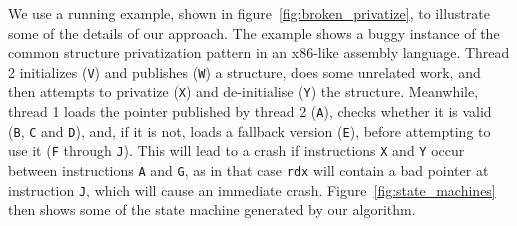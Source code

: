 \documentclass[10pt,twocolumn,preprint,natbib,authoryear]{sigplanconf}
\begin{document}
\begin{figure*}[t]
\caption{State machines produced for the example program}
\label{fig:state_machines}
\end{figure*}

We use a running example, shown in figure~\ref{fig:broken_privatize},
to illustrate some of the details of our approach.  The example shows
a buggy instance of the common structure privatization pattern in an
x86-like assembly language.  Thread 2 initializes (\verb|V|) and
publishes (\verb|W|) a structure, does some unrelated work, and then
attempts to privatize (\verb|X|) and de-initialise (\verb|Y|) the
structure.  Meanwhile, thread 1 loads the pointer published by thread
2 (\verb|A|), checks whether it is valid (\verb|B|, \verb|C| and
\verb|D|), and, if it is not, loads a fallback version (\verb|E|),
before attempting to use it (\verb|F| through \verb|J|).  This will
lead to a crash if instructions \verb|X| and \verb|Y| occur between
instructions \verb|A| and \verb|G|, as in that case \verb|rdx| will
contain a bad pointer at instruction \verb|J|, which will cause an
immediate crash.  Figure~\ref{fig:state_machines} then shows some of
the state machine generated by our algorithm.
\end{document}
